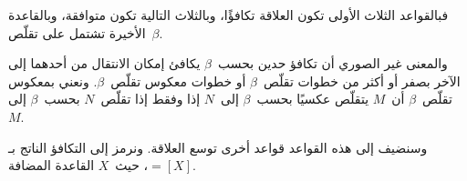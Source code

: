 \documentclass[../../../include/open-logic-section]{subfiles}
\begin{document}
فبالقواعد الثلاث الأولى تكون العلاقة تكافؤًا، وبالثلاث التالية تكون متوافقة،
وبالقاعدة الأخيرة تشتمل على تقلّص~$\beta$.

والمعنى غير الصوري أن تكافؤ حدين بحسب~$\beta$ يكافئ إمكان الانتقال من أحدهما إلى الآخر
بصفر أو أكثر من خطوات تقلّص~$\beta$ أو خطوات معكوس تقلّص~$\beta$.
ونعني بمعكوس تقلّص~$\beta$ أن~$M$ يتقلّص عكسيًا بحسب~$\beta$ إلى~$N$
إذا وفقط إذا تقلّص~$N$ بحسب~$\beta$ إلى~$M$.

وسنضيف إلى هذه القواعد قواعد أخرى توسع العلاقة.
ونرمز إلى التكافؤ الناتج بـ$\equal[X]$، حيث~$X$ القاعدة المضافة.
\end{document}
